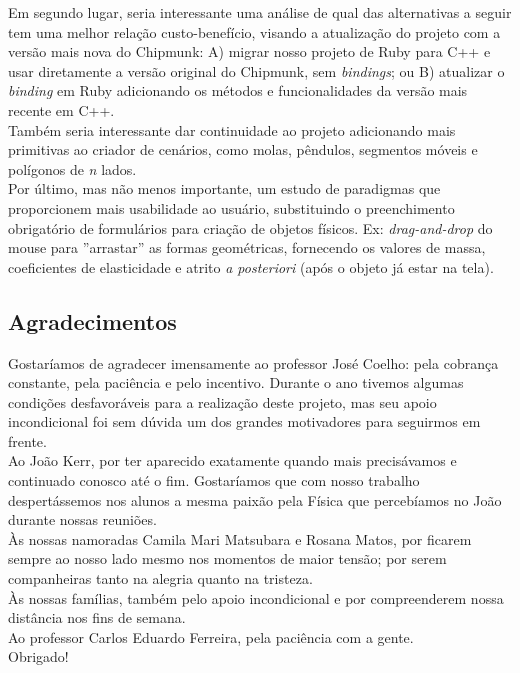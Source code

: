 Em segundo lugar, seria interessante uma análise de qual das alternativas a seguir tem uma melhor relação custo-benefício, visando a atualização do projeto com a versão mais nova do Chipmunk: A) migrar nosso projeto de Ruby para C++ e usar diretamente a versão original do Chipmunk, sem \textit{bindings}; ou B) atualizar o \textit{binding} em Ruby adicionando os métodos e funcionalidades da versão mais recente em C++.\\

Também seria interessante dar continuidade ao projeto adicionando mais primitivas ao criador de cenários, como molas, pêndulos, segmentos móveis e polígonos de \textit{n} lados. \\

Por último, mas não menos importante, um estudo de paradigmas que proporcionem mais usabilidade ao usuário, substituindo o preenchimento obrigatório de formulários para criação de objetos físicos. Ex: \textit{drag-and-drop} do mouse para ''arrastar'' as formas geométricas, fornecendo os valores de massa, coeficientes de elasticidade e atrito \textit{a posteriori} (após o objeto já estar na tela).\\

\subsection{Agradecimentos}
Gostaríamos de agradecer imensamente ao professor José Coelho: pela cobrança constante, pela paciência e pelo incentivo. Durante o ano tivemos algumas condições desfavoráveis para a realização deste projeto, mas seu apoio incondicional foi sem dúvida um dos grandes motivadores para seguirmos em frente. \\

Ao João Kerr, por ter aparecido exatamente quando mais precisávamos e continuado conosco até o fim. Gostaríamos que com nosso trabalho despertássemos nos alunos a mesma paixão pela Física que percebíamos no João durante nossas reuniões. \\

Às nossas namoradas Camila Mari Matsubara e Rosana Matos, por ficarem sempre ao nosso lado mesmo nos momentos de maior tensão; por serem companheiras tanto na alegria quanto na tristeza. \\

Às nossas famílias, também pelo apoio incondicional e por compreenderem nossa distância nos fins de semana. \\

Ao professor Carlos Eduardo Ferreira, pela paciência com a gente.\\

Obrigado!



